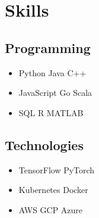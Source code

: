 \documentclass[]{deedy-resume-openfont}
\begin{document}
\begin{minipage}[t]{0.33\textwidth}
\sectionsep

\section{Skills}

\subsection{Programming}
\begin{itemize}
  \item Python \textbullet{} Java \textbullet{} C++
  \item JavaScript \textbullet{} Go \textbullet{} Scala
  \item SQL \textbullet{} R \textbullet{} MATLAB
\end{itemize}

\subsection{Technologies}
\begin{itemize}
  \item TensorFlow \textbullet{} PyTorch
  \item Kubernetes \textbullet{} Docker
  \item AWS \textbullet{} GCP \textbullet{} Azure
\end{itemize}

\end{minipage}
\hfill
\end{document}
